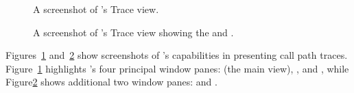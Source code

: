 \begin{figure}[t]
\caption{A screenshot of \hpcviewer{}'s Trace view.}
\label{fig:hpctraceviewer-legend}
\end{figure}

\begin{figure}[t]
\caption{A screenshot of \hpcviewer{}'s Trace view showing the \summaryview{} and \statview.}
\label{fig:hpctraceviewer-stat}
\end{figure}

Figures~\ref{fig:hpctraceviewer-legend} and~\ref{fig:hpctraceviewer-stat} show screenshots of \hpctraceviewer{}'s capabilities in presenting call path traces.
Figure~\ref{fig:hpctraceviewer-legend} highlights \hpctraceviewer{}'s four principal window panes: \traceview (the main view), \depthview, \callview{} and \miniview,
while Figure\ref{fig:hpctraceviewer-stat} shows additional two window panes: \summaryview{} and \statview.

